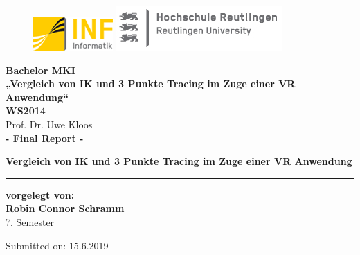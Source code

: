 \begin{titlepage}

\begin{center}

\begin{figure}
\begin{minipage}[H]{4cm}
\centering
\includegraphics[width=0.8\linewidth]{Bilder/Deckblatt/universityLogo}
\end{minipage}
\hfill
\begin{minipage}[H]{6cm}
\centering
\includegraphics[width=1\linewidth]{Bilder/Deckblatt/CompanyLogo}
\end{minipage}
\end{figure}

\vspace*{0.8cm}

\textbf{Bachelor MKI}\\
\textbf{„Vergleich von IK und 3 Punkte Tracing im Zuge einer VR Anwendung“} \\
\vspace*{0.2cm}
{\large \textbf{WS2014\\}}
\vspace*{0.4cm}
Prof. Dr. Uwe Kloos\\
\vspace*{0.8cm}
{\large \textbf{- Final Report -}}

\textbf{{\large {\Large Vergleich von IK und 3 Punkte Tracing im Zuge einer VR Anwendung }}}\\

\noindent\rule{\textwidth}{2pt}
\vspace*{0.6cm}

\textbf{vorgelegt von:\\}
{\large \textbf{Robin Connor Schramm\\}}
7. Semester 

\vspace*{0.6cm}

\vspace*{0.6cm}

Submitted on:	15.6.2019



\end{center}

\end{titlepage}
